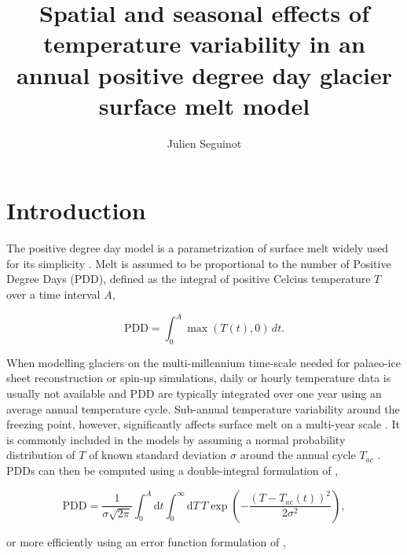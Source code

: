 \documentclass[review]{igs}
\begin{document}
\title[Temperature variability in a positive degree day model]{Spatial and seasonal effects of temperature variability in an annual positive degree day glacier surface melt model}
\author[J. Seguinot]{Julien Seguinot}

\maketitle


\section{Introduction}

The positive degree day model is a parametrization of surface melt widely used for its simplicity \citep{hock-2003}. Melt is assumed to be proportional to the number of Positive Degree Days (PDD), defined as the integral of positive Celcius temperature $T$ over a time interval $A$,

\begin{equation} \label{eq:pdd}
  \mathrm{PDD} = \int_{0}^{A}\max(T(t),0)\,dt.
\end{equation}

When modelling glaciers on the multi-millennium time-scale needed for palaeo-ice sheet reconstruction or spin-up simulations, daily or hourly temperature data is usually not available and PDD are typically integrated over one year using an average annual temperature cycle. Sub-annual temperature variability around the freezing point, however, significantly affects surface melt on a multi-year scale \citep{arnold-mackay-1964}. It is commonly included in the models by assuming a normal probability distribution of $T$ of known standard deviation $\sigma$ around the annual cycle $T_{ac}$ \citep{braithwaite-1984}. PDDs can then be computed using a double-integral formulation of \citet{reeh-1991},

\begin{equation} \label{eq:reeh}
  \mathrm{PDD} = \frac{1}{\sigma\sqrt{2\pi}}
    \int_{0}^{A} \mathrm{d}t
    \int_{0}^{\infty} \mathrm{d}T \,
    T \exp\left({-\frac{(T-T_{ac}(t))^2}{2\sigma^2}}\right),
\end{equation}

or more efficiently using an error function formulation of \citet{calov-greve-2005},
\end{document}

